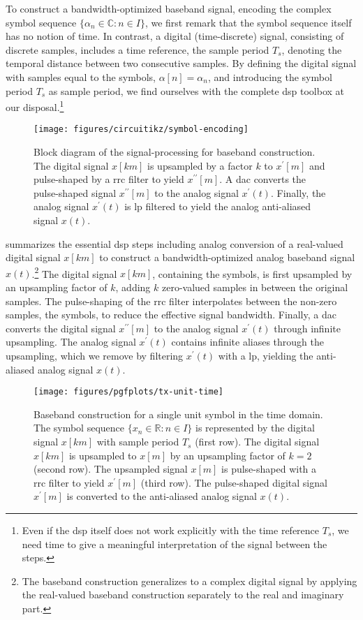 To construct a bandwidth-optimized baseband signal, encoding the complex symbol sequence $\{\alpha_n\in\mathbb{C}\colon n\in I\}$, we first remark that the symbol sequence itself has no notion of time.
In contrast, a digital (time-discrete) signal, consisting of discrete samples, includes a time reference, the sample period $T_s$, denoting the temporal distance between two consecutive samples.
By defining the digital signal with samples equal to the symbols, $\alpha[n]=\alpha_n$, and introducing the symbol period $T_s$ as sample period, we find ourselves with the complete \gls{dsp} toolbox at our disposal.\footnote{Even if the \gls{dsp} itself does not work explicitly with the time reference $T_s$, we need time to give a meaningful interpretation of the signal between the steps.}
\begin{figure}[htb]
	\centering
	\texttt{[image: figures/circuitikz/symbol-encoding]}
	\caption{Block diagram of the signal-processing for baseband construction. The digital signal $x[km]$ is upsampled by a factor $k$ to $x^\prime[m]$ and pulse-shaped by a \gls{rrc} filter to yield $x^{\prime\prime}[m]$. A \gls{dac} converts the pulse-shaped signal $x^{\prime\prime}[m]$ to the analog signal $x^\prime(t)$. Finally, the analog signal $x^\prime(t)$ is \gls{lp} filtered to yield the analog anti-aliased signal $x(t)$.}\label{fig:symbol_encoding}
\end{figure}
 summarizes the essential \gls{dsp} steps including analog conversion of a real-valued digital signal $x[km]$ to construct a bandwidth-optimized analog baseband signal $x(t)$.\footnote{The baseband construction generalizes to a complex digital signal by applying the real-valued baseband construction separately to the real and imaginary part.}
The digital signal $x[km]$, containing the symbols, is first upsampled by an upsampling factor of $k$, adding $k$ zero-valued samples in between the original samples.
The pulse-shaping of the \gls{rrc} filter interpolates between the non-zero samples, the symbols, to reduce the effective signal bandwidth.
Finally, a \gls{dac} converts the digital signal $x^{\prime\prime}[m]$ to the analog signal $x^\prime(t)$ through infinite upsampling.
The analog signal $x^\prime(t)$ contains infinite aliases through the upsampling, which we remove by filtering $x^\prime(t)$ with a \gls{lp}, yielding the anti-aliased analog signal $x(t)$.
\begin{figure}[htb]
	\centering
	\texttt{[image: figures/pgfplots/tx-unit-time]}
	\caption{Baseband construction for a single unit symbol in the time domain. The symbol sequence $\{x_n\in\mathbb{R}\colon n\in I\}$ is represented by the digital signal $x[km]$ with sample period $T_s$ (first row). The digital signal $x[km]$ is upsampled to $x[m]$ by an upsampling factor of $k=2$ (second row). The upsampled signal $x[m]$ is pulse-shaped with a \gls{rrc} filter to yield $x^\prime[m]$ (third row). The pulse-shaped digital signal $x^\prime[m]$ is converted to the anti-aliased analog signal $x(t)$.}\label{fig:baseband_construction_unit_time}
\end{figure}
